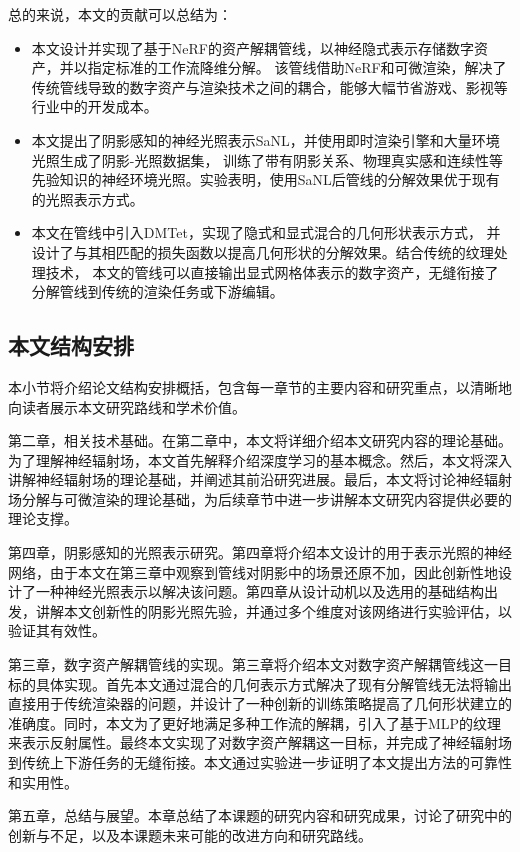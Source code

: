 总的来说，本文的贡献可以总结为：

\begin{itemize}
  \item 本文设计并实现了基于NeRF的资产解耦管线，以神经隐式表示存储数字资产，并以指定标准的工作流降维分解。
  该管线借助NeRF和可微渲染，解决了传统管线导致的数字资产与渲染技术之间的耦合，能够大幅节省游戏、影视等行业中的开发成本。
  \item 本文提出了阴影感知的神经光照表示SaNL，并使用即时渲染引擎和大量环境光照生成了阴影-光照数据集，
  训练了带有阴影关系、物理真实感和连续性等先验知识的神经环境光照。实验表明，使用SaNL后管线的分解效果优于现有的光照表示方式。
  \item 本文在管线中引入DMTet，实现了隐式和显式混合的几何形状表示方式，
  并设计了与其相匹配的损失函数以提高几何形状的分解效果。结合传统的纹理处理技术，
  本文的管线可以直接输出显式网格体表示的数字资产，无缝衔接了分解管线到传统的渲染任务或下游编辑。
\end{itemize}

\subsection{本文结构安排}
本小节将介绍论文结构安排概括，包含每一章节的主要内容和研究重点，以清晰地向读者展示本文研究路线和学术价值。

第二章，相关技术基础。在第二章中，本文将详细介绍本文研究内容的理论基础。为了理解神经辐射场，本文首先解释介绍深度学习的基本概念。然后，本文将深入讲解神经辐射场的理论基础，并阐述其前沿研究进展。最后，本文将讨论神经辐射场分解与可微渲染的理论基础，为后续章节中进一步讲解本文研究内容提供必要的理论支撑。

第四章，阴影感知的光照表示研究。第四章将介绍本文设计的用于表示光照的神经网络，由于本文在第三章中观察到管线对阴影中的场景还原不加，因此创新性地设计了一种神经光照表示以解决该问题。第四章从设计动机以及选用的基础结构出发，讲解本文创新性的阴影光照先验，并通过多个维度对该网络进行实验评估，以验证其有效性。

第三章，数字资产解耦管线的实现。第三章将介绍本文对数字资产解耦管线这一目标的具体实现。首先本文通过混合的几何表示方式解决了现有分解管线无法将输出直接用于传统渲染器的问题，并设计了一种创新的训练策略提高了几何形状建立的准确度。同时，本文为了更好地满足多种工作流的解耦，引入了基于MLP的纹理来表示反射属性。最终本文实现了对数字资产解耦这一目标，并完成了神经辐射场到传统上下游任务的无缝衔接。本文通过实验进一步证明了本文提出方法的可靠性和实用性。

第五章，总结与展望。本章总结了本课题的研究内容和研究成果，讨论了研究中的创新与不足，以及本课题未来可能的改进方向和研究路线。

